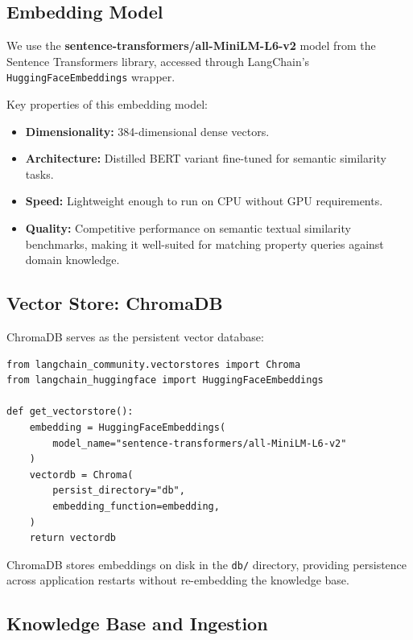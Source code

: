 \documentclass[11pt,a4paper]{article}
\begin{document}
\subsection{Embedding Model}

We use the \textbf{sentence-transformers/all-MiniLM-L6-v2} model from the Sentence Transformers library, accessed through LangChain's \texttt{HuggingFaceEmbeddings} wrapper.

Key properties of this embedding model:

\begin{itemize}[leftmargin=*]
    \item \textbf{Dimensionality:} 384-dimensional dense vectors.
    \item \textbf{Architecture:} Distilled BERT variant fine-tuned for semantic similarity tasks.
    \item \textbf{Speed:} Lightweight enough to run on CPU without GPU requirements.
    \item \textbf{Quality:} Competitive performance on semantic textual similarity benchmarks, making it well-suited for matching property queries against domain knowledge.
\end{itemize}

\subsection{Vector Store: ChromaDB}

ChromaDB serves as the persistent vector database:

\begin{lstlisting}[caption={Vector store initialisation (\texttt{src/rag/vectorstore.py}).}]
from langchain_community.vectorstores import Chroma
from langchain_huggingface import HuggingFaceEmbeddings

def get_vectorstore():
    embedding = HuggingFaceEmbeddings(
        model_name="sentence-transformers/all-MiniLM-L6-v2"
    )
    vectordb = Chroma(
        persist_directory="db",
        embedding_function=embedding,
    )
    return vectordb
\end{lstlisting}

ChromaDB stores embeddings on disk in the \texttt{db/} directory, providing persistence across application restarts without re-embedding the knowledge base.

\subsection{Knowledge Base and Ingestion}
\end{document}
